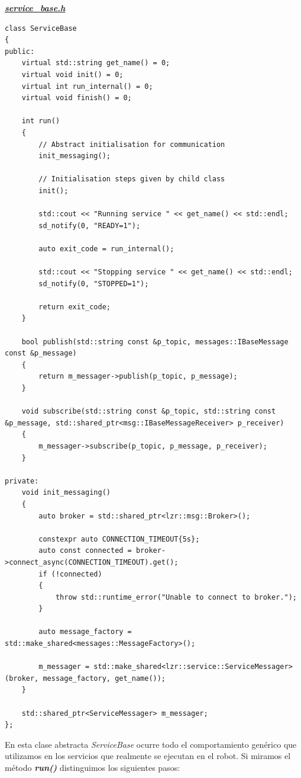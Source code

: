 \textbf{\textit{\href{https://github.com/adrianmorente/lazarillo-embedded/blob/master/service-base/inc/service-base/service_messager.h}{service\_base.h}}}
\begin{lstlisting}
class ServiceBase
{
public:
	virtual std::string get_name() = 0;
	virtual void init() = 0;
	virtual int run_internal() = 0;
	virtual void finish() = 0;
	
	int run()
	{
		// Abstract initialisation for communication
		init_messaging();
		
		// Initialisation steps given by child class
		init();
		
		std::cout << "Running service " << get_name() << std::endl;
		sd_notify(0, "READY=1");
		
		auto exit_code = run_internal();
		
		std::cout << "Stopping service " << get_name() << std::endl;
		sd_notify(0, "STOPPED=1");
		
		return exit_code;
	}

	bool publish(std::string const &p_topic, messages::IBaseMessage const &p_message)
	{
		return m_messager->publish(p_topic, p_message);
	}

	void subscribe(std::string const &p_topic, std::string const &p_message, std::shared_ptr<msg::IBaseMessageReceiver> p_receiver)
	{
		m_messager->subscribe(p_topic, p_message, p_receiver);
	}
	
private:
	void init_messaging()
	{
		auto broker = std::shared_ptr<lzr::msg::Broker>();
		
		constexpr auto CONNECTION_TIMEOUT{5s};
		auto const connected = broker->connect_async(CONNECTION_TIMEOUT).get();
		if (!connected)
		{
			throw std::runtime_error("Unable to connect to broker.");
		}
		
		auto message_factory = std::make_shared<messages::MessageFactory>();
		
		m_messager = std::make_shared<lzr::service::ServiceMessager>(broker, message_factory, get_name());
	}
	
	std::shared_ptr<ServiceMessager> m_messager;
};
\end{lstlisting}

En esta clase abstracta \textit{ServiceBase} ocurre todo el comportamiento genérico que utilizamos en los servicios que realmente se ejecutan en el robot. Si miramos el método \textbf{\textit{run()}} distinguimos los siguientes pasos:

